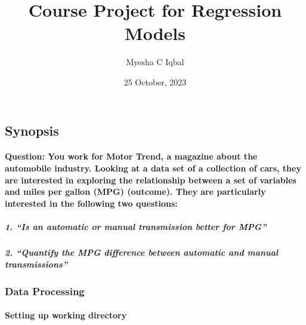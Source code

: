 \documentclass[
]{article}
\title{Course Project for Regression Models}
\author{Myesha C Iqbal}
\date{25 October, 2023}
\begin{document}
\maketitle

\hypertarget{synopsis}{%
\subsection{Synopsis}\label{synopsis}}

\hypertarget{question-you-work-for-motor-trend-a-magazine-about-the-automobile-industry.-looking-at-a-data-set-of-a-collection-of-cars-they-are-interested-in-exploring-the-relationship-between-a-set-of-variables-and-miles-per-gallon-mpg-outcome.-they-are-particularly-interested-in-the-following-two-questions}{%
\paragraph{Question: You work for Motor Trend, a magazine about the
automobile industry. Looking at a data set of a collection of cars, they
are interested in exploring the relationship between a set of variables
and miles per gallon (MPG) (outcome). They are particularly interested
in the following two
questions:}\label{question-you-work-for-motor-trend-a-magazine-about-the-automobile-industry.-looking-at-a-data-set-of-a-collection-of-cars-they-are-interested-in-exploring-the-relationship-between-a-set-of-variables-and-miles-per-gallon-mpg-outcome.-they-are-particularly-interested-in-the-following-two-questions}}

\hypertarget{is-an-automatic-or-manual-transmission-better-for-mpg}{%
\subparagraph{1. ``Is an automatic or manual transmission better for
MPG''}\label{is-an-automatic-or-manual-transmission-better-for-mpg}}

\hypertarget{quantify-the-mpg-difference-between-automatic-and-manual-transmissions}{%
\subparagraph{2. ``Quantify the MPG difference between automatic and
manual
transmissions''}\label{quantify-the-mpg-difference-between-automatic-and-manual-transmissions}}

\hypertarget{data-processing}{%
\subsubsection{Data Processing}\label{data-processing}}

\hypertarget{setting-up-working-directory}{%
\paragraph{Setting up working
directory}\label{setting-up-working-directory}}
\end{document}
